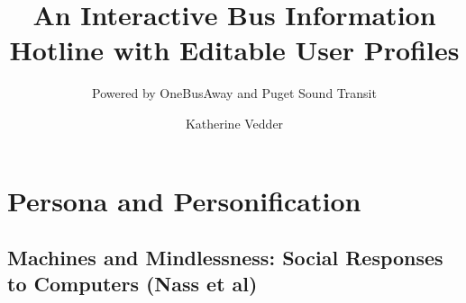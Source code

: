 \documentclass{scrartcl}
\title{An Interactive Bus Information Hotline with Editable User Profiles}
\subtitle{Powered by OneBusAway and Puget Sound Transit}
\author{Katherine Vedder}
\begin{document}
\maketitle

\section*{Persona and Personification}
\subsection*{Machines and Mindlessness: Social Responses to Computers (Nass et al)}
\end{document}
